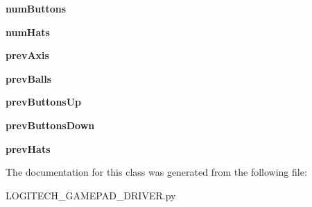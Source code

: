 \begin{DoxyCompactItemize}
\item 
\hypertarget{classdriver_1_1LOGITECH__GAMEPAD__DRIVER_1_1LogitechGamepadDriver_a2fc0fc1494b1da9c730a82489b4366bb}{}{\bfseries num\+Buttons}\label{classdriver_1_1LOGITECH__GAMEPAD__DRIVER_1_1LogitechGamepadDriver_a2fc0fc1494b1da9c730a82489b4366bb}

\item 
\hypertarget{classdriver_1_1LOGITECH__GAMEPAD__DRIVER_1_1LogitechGamepadDriver_a6b0855ed9f8492c59266ef282b91906c}{}{\bfseries num\+Hats}\label{classdriver_1_1LOGITECH__GAMEPAD__DRIVER_1_1LogitechGamepadDriver_a6b0855ed9f8492c59266ef282b91906c}

\item 
\hypertarget{classdriver_1_1LOGITECH__GAMEPAD__DRIVER_1_1LogitechGamepadDriver_a98667a083c870cdf65ea8e047610b9a3}{}{\bfseries prev\+Axis}\label{classdriver_1_1LOGITECH__GAMEPAD__DRIVER_1_1LogitechGamepadDriver_a98667a083c870cdf65ea8e047610b9a3}

\item 
\hypertarget{classdriver_1_1LOGITECH__GAMEPAD__DRIVER_1_1LogitechGamepadDriver_abfa5d9779b86d4914b2331f36daf5da3}{}{\bfseries prev\+Balls}\label{classdriver_1_1LOGITECH__GAMEPAD__DRIVER_1_1LogitechGamepadDriver_abfa5d9779b86d4914b2331f36daf5da3}

\item 
\hypertarget{classdriver_1_1LOGITECH__GAMEPAD__DRIVER_1_1LogitechGamepadDriver_ae1e571536fd2c9e2d1c8fe9c26faf679}{}{\bfseries prev\+Buttons\+Up}\label{classdriver_1_1LOGITECH__GAMEPAD__DRIVER_1_1LogitechGamepadDriver_ae1e571536fd2c9e2d1c8fe9c26faf679}

\item 
\hypertarget{classdriver_1_1LOGITECH__GAMEPAD__DRIVER_1_1LogitechGamepadDriver_aa26068a6236421363dc2a4a373f134d5}{}{\bfseries prev\+Buttons\+Down}\label{classdriver_1_1LOGITECH__GAMEPAD__DRIVER_1_1LogitechGamepadDriver_aa26068a6236421363dc2a4a373f134d5}

\item 
\hypertarget{classdriver_1_1LOGITECH__GAMEPAD__DRIVER_1_1LogitechGamepadDriver_aa8da5cd73f609421083322375f6f5299}{}{\bfseries prev\+Hats}\label{classdriver_1_1LOGITECH__GAMEPAD__DRIVER_1_1LogitechGamepadDriver_aa8da5cd73f609421083322375f6f5299}

\end{DoxyCompactItemize}


The documentation for this class was generated from the following file\+:\begin{DoxyCompactItemize}
\item 
L\+O\+G\+I\+T\+E\+C\+H\+\_\+\+G\+A\+M\+E\+P\+A\+D\+\_\+\+D\+R\+I\+V\+E\+R.\+py\end{DoxyCompactItemize}
